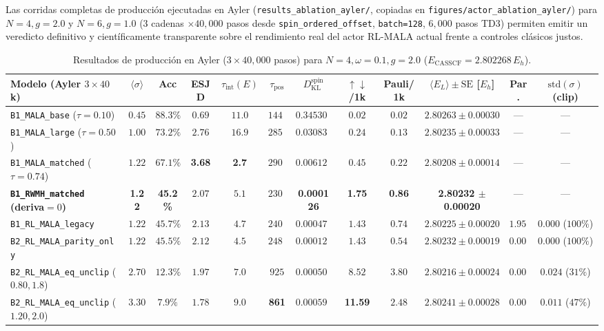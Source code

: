 \documentclass[10pt,a4paper]{article}
\begin{document}
Las corridas completas de producción ejecutadas en Ayler (\texttt{results\_ablation\_ayler/}, copiadas en \texttt{figures/actor\_ablation\_ayler/}) para $N=4, g=2.0$ y $N=6, g=1.0$ ($3$ cadenas $\times 40{,}000$ pasos desde \texttt{spin\_ordered\_offset}, \texttt{batch=128}, $6{,}000$ pasos TD3) permiten emitir un veredicto definitivo y científicamente transparente sobre el rendimiento real del actor RL-MALA actual frente a controles clásicos justos.

\begin{table}[H]
\centering
\caption{Resultados de producción en Ayler ($3\times 40{,}000$ pasos) para $N=4, \omega=0.1, g=2.0$ ($E_{\mathrm{CASSCF}} = 2.802268\,E_h$).}
\label{tab:ayler_n4_g2}
\begin{adjustbox}{max width=\textwidth}
\begin{tabular}{lccccccccccc}
\toprule
\textbf{Modelo (Ayler $3\times 40$k)} & $\langle\sigma\rangle$ & \textbf{Acc} & \textbf{ESJD} & $\tau_{\mathrm{int}}(E)$ & $\tau_{\mathrm{pos}}$ & $D_{\mathrm{KL}}^{\mathrm{spin}}$ & \textbf{$\uparrow\downarrow$/1k} & \textbf{Pauli/1k} & $\langle E_L\rangle \pm \mathrm{SE}$ [$E_h$] & \textbf{Par.} & $\mathrm{std}(\sigma)$ (\textbf{clip}) \\
\midrule
\texttt{B1\_MALA\_base} ($\tau=0.10$) & $0.45$ & $88.3\%$ & $0.69$ & $11.0$ & $1448$ & $0.345300$ & $0.02$ & $0.02$ & $2.80263 \pm 0.00030$ & --- & --- \\
\texttt{B1\_MALA\_large} ($\tau=0.50$) & $1.00$ & $73.2\%$ & $2.76$ & $16.9$ & $2858$ & $0.030836$ & $0.24$ & $0.13$ & $2.80235 \pm 0.00033$ & --- & --- \\
\texttt{B1\_MALA\_matched} ($\tau=0.74$) & $1.22$ & $67.1\%$ & \textbf{3.68} & \textbf{2.7} & $2903$ & $0.006129$ & $0.45$ & $0.22$ & $2.80208 \pm 0.00014$ & --- & --- \\
\textbf{\texttt{B1\_RWMH\_matched} (deriva$=0$)} & \textbf{1.22} & \textbf{45.2\%} & $2.07$ & $5.1$ & $2303$ & \textbf{0.000126} & \textbf{1.75} & \textbf{0.86} & \textbf{2.80232 $\pm$ 0.00020} & --- & --- \\
\texttt{B1\_RL\_MALA\_legacy} & $1.22$ & $45.7\%$ & $2.13$ & $4.7$ & $2402$ & $0.000477$ & $1.43$ & $0.74$ & $2.80225 \pm 0.00020$ & $1.957$ & $0.000$ ($100\%$) \\
\texttt{B2\_RL\_MALA\_parity\_only} & $1.22$ & $45.5\%$ & $2.12$ & $4.5$ & $2483$ & $0.000129$ & $1.43$ & $0.54$ & $2.80232 \pm 0.00019$ & $0.000$ & $0.000$ ($100\%$) \\
\texttt{B2\_RL\_MALA\_eq\_unclip} ($0.80, 1.8$) & $2.70$ & $12.3\%$ & $1.97$ & $7.0$ & $925$ & $0.000506$ & $8.52$ & $3.80$ & $2.80216 \pm 0.00024$ & $0.000$ & $0.024$ ($31\%$) \\
\texttt{B2\_RL\_MALA\_eq\_unclip} ($1.20, 2.0$) & $3.30$ & $7.9\%$ & $1.78$ & $9.0$ & \textbf{861} & $0.000595$ & \textbf{11.59} & $2.48$ & $2.80241 \pm 0.00028$ & $0.000$ & $0.011$ ($47\%$) \\
\bottomrule
\end{tabular}
\end{adjustbox}
\end{table}
\end{document}
